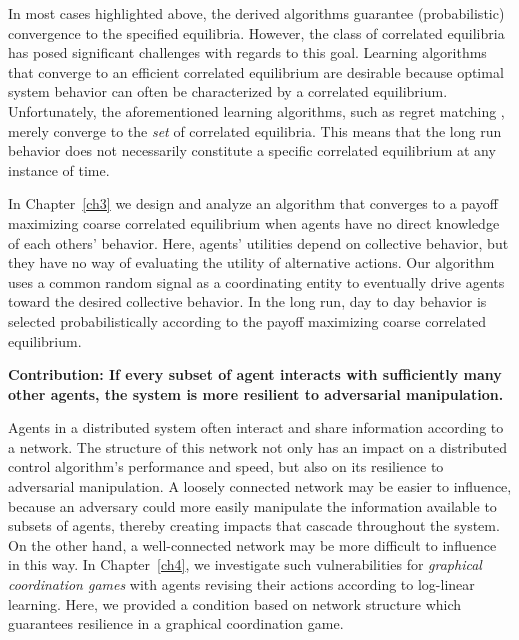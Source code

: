 In most cases highlighted above, the derived algorithms guarantee (probabilistic) convergence to the specified equilibria.  However, the class of correlated equilibria has posed significant challenges with regards to this goal. Learning algorithms that converge to an efficient correlated equilibrium are desirable because optimal system behavior can often be characterized by a correlated equilibrium. Unfortunately, the aforementioned learning algorithms, such as regret matching \cite{Hart2000}, merely converge to the {\it set} of correlated equilibria. This means that the long run behavior does not necessarily constitute a specific correlated equilibrium at any instance of time.


In Chapter~\ref{ch3} we design and analyze an algorithm that converges to a payoff maximizing coarse correlated equilibrium when agents have no direct knowledge of each others' behavior. Here, agents' utilities depend on collective behavior, but they have no way of evaluating the utility of alternative actions. Our algorithm uses a common random signal as a coordinating entity to eventually drive agents toward the desired collective behavior. In the long run, day to day behavior is selected probabilistically according to the payoff maximizing coarse correlated equilibrium.

 

\smallskip

 \noindent\textbf{Contribution: If every subset of agent interacts with sufficiently many other agents, the system is more resilient to adversarial manipulation.}


Agents in a distributed system often interact and share information according to a network. The structure of this network not only has an impact on a distributed control algorithm's performance and speed, but also on its resilience to adversarial manipulation. A loosely connected network may be easier to influence, because an adversary could more easily manipulate the information available to subsets of agents, thereby creating impacts that cascade throughout the system. On the other hand, a well-connected network may be more difficult to influence in this way. In Chapter~\ref{ch4}, we investigate such vulnerabilities for  {\it graphical coordination games} \cite{Ullmann1977,Cooper1999} with agents revising their actions according to log-linear learning. Here, we provided a condition based on network structure which guarantees resilience in a graphical coordination game. 

